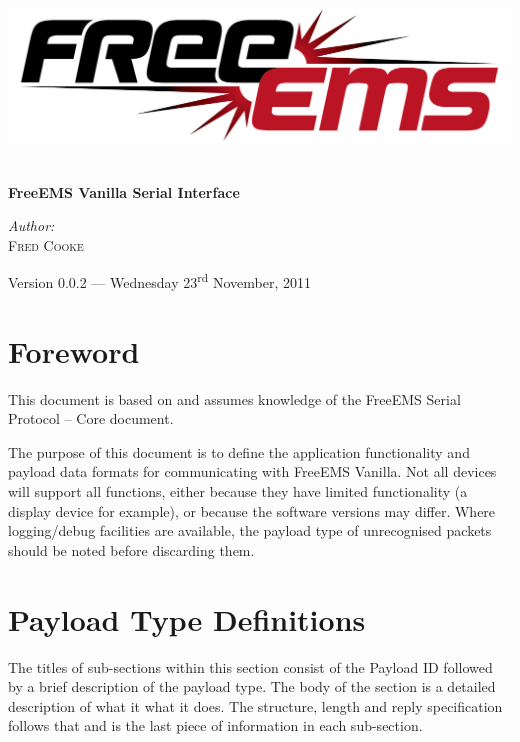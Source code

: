 \documentclass[12pt,a4paper,titlepage]{article}
\begin{document}
\begin{titlepage} 
\begin{center}

\includegraphics[width=1\textwidth]{./logos/freeems}\\[1cm] \vfill

\HRule \\[0.8cm]
{ \huge \bfseries FreeEMS Vanilla Serial Interface }\\[0.4cm]
\HRule \vfill

\Large \emph{Author:}\\
\textsc{Fred Cooke} \vfill

{\large Version 0.0.2 --- Wednesday 23\textsuperscript{rd} November, 2011}






\section {Foreword}

This document is based on and assumes knowledge of the FreeEMS Serial Protocol -- Core document.

The purpose of this document is to define the application functionality and payload data formats for communicating with FreeEMS Vanilla. Not all devices will support all functions, either because they have limited functionality (a display device for example), or because the software versions may differ. Where logging/debug facilities are available, the payload type of unrecognised packets should be noted before discarding them.




\newpage
\section {Payload Type Definitions}

The titles of sub-sections within this section consist of the Payload ID followed by a brief description of the payload type. The body of the section is a detailed description of what it what it does. The structure, length and reply specification follows that and is the last piece of information in each sub-section.



\end{center}
\end{titlepage}
\end{document}
